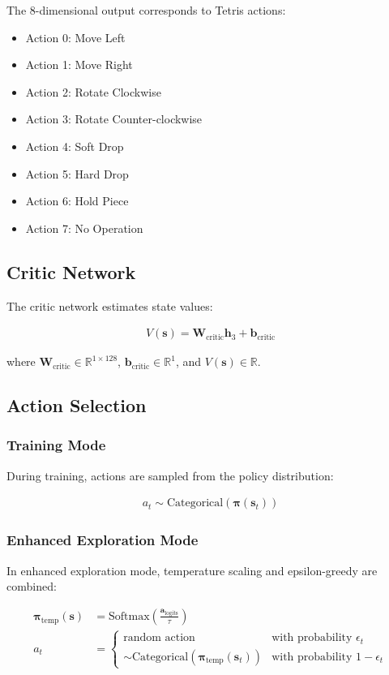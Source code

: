 \documentclass[12pt]{article}
\begin{document}
The 8-dimensional output corresponds to Tetris actions:
\begin{itemize}
    \item Action 0: Move Left
    \item Action 1: Move Right  
    \item Action 2: Rotate Clockwise
    \item Action 3: Rotate Counter-clockwise
    \item Action 4: Soft Drop
    \item Action 5: Hard Drop
    \item Action 6: Hold Piece
    \item Action 7: No Operation
\end{itemize}

\subsection{Critic Network}

The critic network estimates state values:

\begin{align}
V(\mathbf{s}) = \mathbf{W}_{\text{critic}} \mathbf{h}_3 + \mathbf{b}_{\text{critic}}
\end{align}

where $\mathbf{W}_{\text{critic}} \in \mathbb{R}^{1 \times 128}$, $\mathbf{b}_{\text{critic}} \in \mathbb{R}^{1}$, and $V(\mathbf{s}) \in \mathbb{R}$.

\subsection{Action Selection}

\subsubsection{Training Mode}
During training, actions are sampled from the policy distribution:

\begin{align}
a_t \sim \text{Categorical}(\boldsymbol{\pi}(\mathbf{s}_t))
\end{align}

\subsubsection{Enhanced Exploration Mode}
In enhanced exploration mode, temperature scaling and epsilon-greedy are combined:

\begin{align}
\boldsymbol{\pi}_{\text{temp}}(\mathbf{s}) &= \text{Softmax}\left(\frac{\mathbf{a}_{\text{logits}}}{\tau}\right) \\
a_t &= \begin{cases}
\text{random action} & \text{with probability } \epsilon_t \\
\sim \text{Categorical}(\boldsymbol{\pi}_{\text{temp}}(\mathbf{s}_t)) & \text{with probability } 1 - \epsilon_t
\end{cases}
\end{align}
\end{document}
